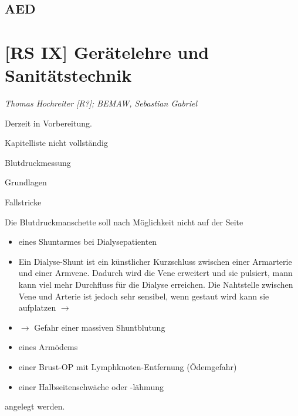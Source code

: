 \documentclass{article}
\begin{document}
\subsection{AED}
\section{[RS IX] Ger\"atelehre und Sanit\"atstechnik}
{\mdseries\itshape
Thomas Hochreiter [R?]; BEMAW, Sebastian Gabriel}

{\mdseries
Derzeit in Vorbereitung. }

{\mdseries
Kapitelliste nicht vollst\"andig}

{\mdseries\color[rgb]{0.0,0.0,0.5019608}
Blutdruckmessung}

{\mdseries\color{black}
Grundlagen}

{\mdseries\color{black}
Fallstricke}

{\mdseries
Die Blutdruckmanschette soll nach M\"oglichkeit nicht auf der Seite}

\begin{itemize}
\item {\mdseries
eines Shuntarmes bei Dialysepatienten}

\end{itemize}
\begin{itemize}
\item {\mdseries
Ein Dialyse-Shunt ist ein k\"unstlicher Kurzschluss zwischen einer
Armarterie und einer Armvene. Dadurch wird die Vene erweitert und sie
pulsiert, mann kann viel mehr Durchfluss f\"ur die Dialyse
erreichen.\newline
Die Nahtstelle zwischen Vene und Arterie ist jedoch sehr sensibel, wenn
gestaut wird kann sie aufplatzen ${\rightarrow}$ }

\item {\mdseries
${\rightarrow}$ Gefahr einer massiven Shuntblutung}

\end{itemize}
\begin{itemize}
\item {\mdseries
eines Arm\"odems}

\item {\mdseries
einer Brust-OP mit Lymphknoten-Entfernung (\"Odemgefahr)}

\item {\mdseries
einer Halbseitenschw\"ache oder -l\"ahmung }

\end{itemize}
{\mdseries
angelegt werden. }
\end{document}
